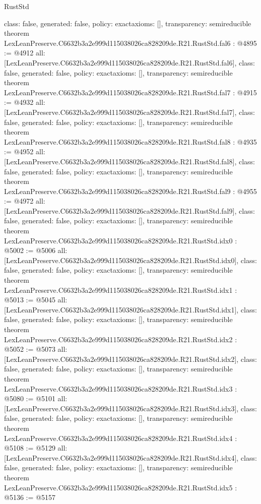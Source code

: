 \begin{lexlean}{RustStd}
\begin{coremodule}
{  class: false,
  generated: false,
  policy: exact{axioms: []},
  transparency: semireducible
}
theorem LexLeanPreserve.C6632b3a2e999d115038026ca828209de.R21.RustStd.fal6 : @4895 := @4912 {
  all: [LexLeanPreserve.C6632b3a2e999d115038026ca828209de.R21.RustStd.fal6],
  class: false,
  generated: false,
  policy: exact{axioms: []},
  transparency: semireducible
}
theorem LexLeanPreserve.C6632b3a2e999d115038026ca828209de.R21.RustStd.fal7 : @4915 := @4932 {
  all: [LexLeanPreserve.C6632b3a2e999d115038026ca828209de.R21.RustStd.fal7],
  class: false,
  generated: false,
  policy: exact{axioms: []},
  transparency: semireducible
}
theorem LexLeanPreserve.C6632b3a2e999d115038026ca828209de.R21.RustStd.fal8 : @4935 := @4952 {
  all: [LexLeanPreserve.C6632b3a2e999d115038026ca828209de.R21.RustStd.fal8],
  class: false,
  generated: false,
  policy: exact{axioms: []},
  transparency: semireducible
}
theorem LexLeanPreserve.C6632b3a2e999d115038026ca828209de.R21.RustStd.fal9 : @4955 := @4972 {
  all: [LexLeanPreserve.C6632b3a2e999d115038026ca828209de.R21.RustStd.fal9],
  class: false,
  generated: false,
  policy: exact{axioms: []},
  transparency: semireducible
}
theorem LexLeanPreserve.C6632b3a2e999d115038026ca828209de.R21.RustStd.idx0 : @5002 := @5006 {
  all: [LexLeanPreserve.C6632b3a2e999d115038026ca828209de.R21.RustStd.idx0],
  class: false,
  generated: false,
  policy: exact{axioms: []},
  transparency: semireducible
}
theorem LexLeanPreserve.C6632b3a2e999d115038026ca828209de.R21.RustStd.idx1 : @5013 := @5045 {
  all: [LexLeanPreserve.C6632b3a2e999d115038026ca828209de.R21.RustStd.idx1],
  class: false,
  generated: false,
  policy: exact{axioms: []},
  transparency: semireducible
}
theorem LexLeanPreserve.C6632b3a2e999d115038026ca828209de.R21.RustStd.idx2 : @5052 := @5073 {
  all: [LexLeanPreserve.C6632b3a2e999d115038026ca828209de.R21.RustStd.idx2],
  class: false,
  generated: false,
  policy: exact{axioms: []},
  transparency: semireducible
}
theorem LexLeanPreserve.C6632b3a2e999d115038026ca828209de.R21.RustStd.idx3 : @5080 := @5101 {
  all: [LexLeanPreserve.C6632b3a2e999d115038026ca828209de.R21.RustStd.idx3],
  class: false,
  generated: false,
  policy: exact{axioms: []},
  transparency: semireducible
}
theorem LexLeanPreserve.C6632b3a2e999d115038026ca828209de.R21.RustStd.idx4 : @5108 := @5129 {
  all: [LexLeanPreserve.C6632b3a2e999d115038026ca828209de.R21.RustStd.idx4],
  class: false,
  generated: false,
  policy: exact{axioms: []},
  transparency: semireducible
}
theorem LexLeanPreserve.C6632b3a2e999d115038026ca828209de.R21.RustStd.idx5 : @5136 := @5157 {
}
\end{coremodule}
\end{lexlean}
